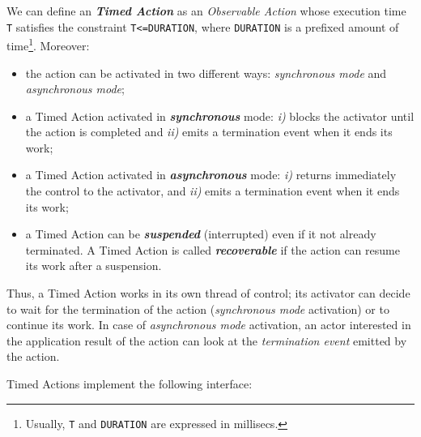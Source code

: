 We can define an \textit{\textbf{Timed Action}} as an \textit{Observable Action} whose execution time \texttt{T} satisfies the constraint \texttt{T<=DURATION}, where \texttt{DURATION} is a prefixed amount of time\footnote{Usually, \texttt{T} and \texttt{DURATION} are expressed in millisecs.}. Moreover:
\begin{itemize}
\item the action can be activated in two different ways: \textit{synchronous mode} and \textit{asynchronous mode};
\item a Timed Action activated in  \textit{\textbf{synchronous}} mode: \textit{i)} blocks the activator until the action is completed and \textit{ii)} emits a termination event when it ends its work;
\item a Timed Action activated in  \textit{\textbf{asynchronous}} mode:  \textit{i)} returns immediately the control to the activator, and \textit{ii)} emits a termination event when it ends its work;
\item a Timed Action can be \textit{\textbf{suspended}} (interrupted) even if it not already terminated. A Timed Action is called \textbf{\textit{recoverable}} if the action can resume its work after a suspension.
\end{itemize}

Thus, a Timed Action works in its own thread of control; its activator can decide to wait for the termination of the action (\textit{synchronous mode} activation) or to continue its work. In case of \textit{asynchronous mode} activation, an actor interested in the application result of the action can look at the \textit{termination event} emitted by the action. 


Timed Actions implement the following interface: 



